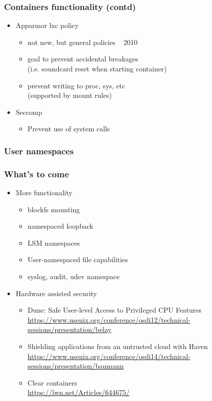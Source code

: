 \documentclass{beamer}
\begin{document}
\begin{frame}
\frametitle{Containers functionality (contd)}
\begin{itemize}
\item Apparmor lxc policy
  \begin{itemize}
  \item not new, but general policies ~ 2010
  \item  goal to prevent accidental breakages \\
  (i.e. soundcard reset when starting container)
  \item prevent writing to proc, sys, etc \\
  (supported by mount rules)
  \end{itemize}
\item Seccomp
  \begin{itemize}
  \item Prevent use of system calls
  \end{itemize}
\end{itemize}

\end{frame}

\begin{frame}
\frametitle{User namespaces}
\end{frame}


\begin{frame}
\frametitle{What's to come}
\begin{itemize}
\item More functionality
  \begin{itemize}
  \item blockfs mounting
  \item namespaced loopback
  \item LSM namespaces
  \item User-namespaced file capabilities
  \item syslog, audit, udev namespace
  \end{itemize}

\item Hardware assisted security
  \begin{itemize}
  \item Dune: Safe User-level Access to Privileged CPU Features \\
  {\tiny \url{https://www.usenix.org/conference/osdi12/technical-sessions/presentation/belay}}
  \item Shielding applications from an untrusted cloud with Haven \\
  {\tiny \url{https://www.usenix.org/conference/osdi14/technical-sessions/presentation/baumann}}
  \item Clear containers \\
  {\tiny \url{https://lwn.net/Articles/644675/}}
  \end{itemize}
\end{itemize}

\end{frame}



\end{document}
